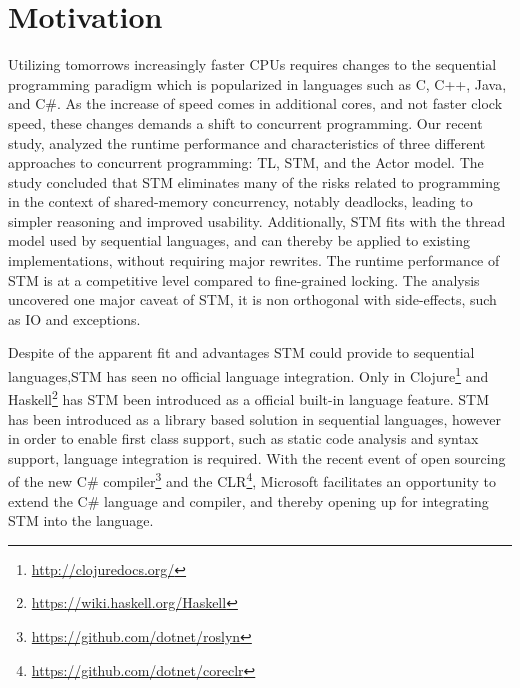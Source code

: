 \makeatletter {}\makeatother
{}
%
\section{Motivation}
Utilizing tomorrows increasingly faster \acp{CPU} requires changes to the sequential programming paradigm which is popularized in languages such as C, C++, Java, and C\#. As the increase of speed comes in additional cores, and not faster clock speed\cite{sutter2005free}, these changes demands a shift to concurrent programming. Our recent study\cite{dpt907e14trending}, analyzed the runtime performance and characteristics of three different approaches to concurrent programming: \ac{TL}, \ac{STM}, and the Actor model. The study concluded that \ac{STM} eliminates many of the risks related to programming in the context of shared-memory concurrency, notably deadlocks, leading to simpler reasoning and improved usability. Additionally, \ac{STM} fits with the thread model used by sequential languages, and can thereby be applied to existing implementations, without requiring major rewrites. The runtime performance of \ac{STM} is at a competitive level compared to fine-grained locking\cite{dpt907e14trending}. The analysis uncovered one major caveat of \ac{STM}, it is non orthogonal with side-effects, such as \ac{IO} and exceptions\cite{dpt907e14trending}.

Despite of the apparent fit and advantages \ac{STM} could provide to sequential languages,\ac{STM} has seen no official language integration. Only in Clojure\footnote{\url{http://clojuredocs.org/}} and Haskell\footnote{\url{https://wiki.haskell.org/Haskell}} has \ac{STM} been introduced as a official built-in language feature. \ac{STM} has been introduced as a library based solution in sequential languages, however in order to enable first class support, such as static code analysis and syntax support, language integration is required. With the recent event of open sourcing of the new C\# compiler\footnote{\url{https://github.com/dotnet/roslyn}} and the \ac{CLR}\footnote{\url{https://github.com/dotnet/coreclr}}, Microsoft facilitates an opportunity to extend the C\# language and compiler, and thereby opening up for integrating \ac{STM} into the language.

